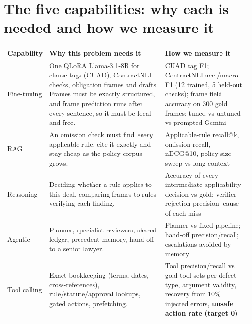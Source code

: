 \documentclass[11pt,a4paper]{article}
\begin{document}
\section{The five capabilities: why each is needed and how we measure it}
\begin{table}[H]\small
\begin{tabularx}{\textwidth}{@{}p{2.1cm}LL@{}}
\toprule
\textbf{Capability} & \textbf{Why this problem needs it} & \textbf{How we measure it} \\
\midrule
Fine-tuning & One QLoRA Llama-3.1-8B for clause tags (CUAD), ContractNLI checks, obligation frames and drafts. Frames must be exactly structured, and frame prediction runs after every sentence, so it must be local and free. & CUAD tag F1; ContractNLI acc./macro-F1 (12 trained, 5 held-out checks); frame field accuracy on 300 gold frames; tuned vs untuned vs prompted Gemini \\
RAG & An omission check must find \emph{every} applicable rule, cite it exactly and stay cheap as the policy corpus grows. & Applicable-rule recall@k, omission recall, nDCG@10, policy-size sweep vs long context \\
Reasoning & Deciding whether a rule applies to this deal, comparing frames to rules, verifying each finding. & Accuracy of every intermediate applicability decision vs gold; verifier rejection precision; cause of each miss \\
Agentic & Planner, specialist reviewers, shared ledger, precedent memory, hand-off to a senior lawyer. & Planner vs fixed pipeline; hand-off precision/recall; escalations avoided by memory \\
Tool calling & Exact bookkeeping (terms, dates, cross-references), rule/statute/approval lookups, gated actions, prefetching. & Tool precision/recall vs gold tool sets per defect type, argument validity, recovery from 10\% injected errors, \textbf{unsafe action rate (target 0)} \\
\bottomrule
\end{tabularx}
\end{table}

\end{document}

